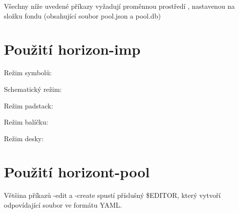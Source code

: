 \documentclass[letterpaper,10pt,czech]{sphinxmanual}
\begin{document}
Všechny níže uvedené příkazy vyžadují proměnnou prostředí
, nastavenou na složku fondu (obsahující soubor pool.json a pool.db)


\section{Použití horizon-imp}
\label{\detokenize{cli-usage_cz:pouziti-horizon-imp}}
\begin{DUlineblock}{0em}
\item[] Režim symbolů:
\item[] 
\end{DUlineblock}

\begin{DUlineblock}{0em}
\item[] Schematický režim:
\item[] 
\end{DUlineblock}

\begin{DUlineblock}{0em}
\item[] Režim padstack:
\item[] 
\end{DUlineblock}

\begin{DUlineblock}{0em}
\item[] Režim balíčku:
\item[] 
\end{DUlineblock}

\begin{DUlineblock}{0em}
\item[] Režim desky:
\item[] 
\end{DUlineblock}


\section{Použití horizont-pool}
\label{\detokenize{cli-usage_cz:pouziti-horizont-pool}}
Většina příkazů -edit a -create spustí příslušný \$EDITOR, který vytvoří odpovídající soubor ve formátu YAML.
\end{document}
